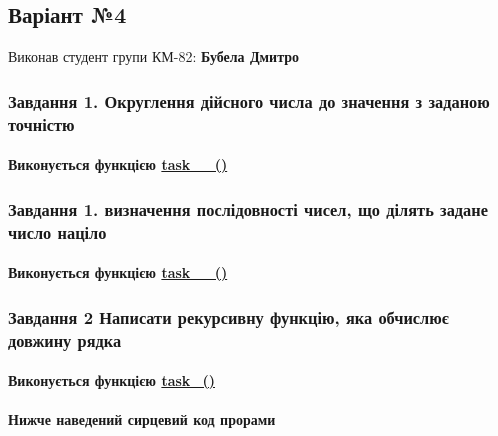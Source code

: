 \begin{center} \subsection*{Варіант №4}\end{center} 

\begin{center} \end{center}  Виконав студент групи КМ-\/82\+: {\bfseries Бубела Дмитро}~\newline
 \subsubsection*{Завдання 1. Округлення дійсного числа до значення з заданою точністю}

\paragraph*{Виконується функцією \hyperlink{main_8c_a40968dfe24ede22947096429f30444a4}{task\+\_\+\_()}}

\subsubsection*{Завдання 1. визначення послідовності чисел, що ділять задане число націло}

\paragraph*{Виконується функцією \hyperlink{main_8c_a97a9145d16ec992fa06404b068bd4e18}{task\+\_\+\_()}}

\subsubsection*{Завдання 2 Написати рекурсивну функцію, яка обчислює довжину рядка}

\paragraph*{Виконується функцією \hyperlink{main_8c_a08570886a32f0508e2a3f23c4ea06339}{task\+\_()}}

\paragraph*{Нижче наведений сирцевий код прорами}


